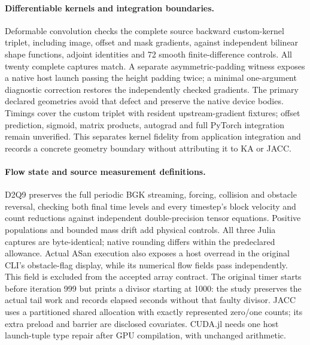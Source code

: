 \paragraph{Differentiable kernels and integration boundaries.}
Deformable convolution checks the complete source backward custom-kernel triplet, including image, offset and mask gradients, against independent bilinear shape functions, adjoint identities and 72 smooth finite-difference controls. All twenty complete captures match. A separate asymmetric-padding witness exposes a native host launch passing the height padding twice; a minimal one-argument diagnostic correction restores the independently checked gradients. The primary declared geometries avoid that defect and preserve the native device bodies. Timings cover the custom triplet with resident upstream-gradient fixtures; offset prediction, sigmoid, matrix products, autograd and full PyTorch integration remain unverified. This separates kernel fidelity from application integration and records a concrete geometry boundary without attributing it to KA or JACC.

\paragraph{Flow state and source measurement definitions.}
D2Q9 preserves the full periodic BGK streaming, forcing, collision and obstacle reversal, checking both final time levels and every timestep's block velocity and count reductions against independent double-precision tensor equations. Positive populations and bounded mass drift add physical controls. All three Julia captures are byte-identical; native rounding differs within the predeclared allowance. Actual ASan execution also exposes a host overread in the original CLI's obstacle-flag display, while its numerical flow fields pass independently. This field is excluded from the accepted array contract. The original timer starts before iteration 999 but prints a divisor starting at 1000: the study preserves the actual tail work and records elapsed seconds without that faulty divisor. JACC uses a partitioned shared allocation with exactly represented zero/one counts; its extra preload and barrier are disclosed covariates. CUDA.jl needs one host launch-tuple type repair after GPU compilation, with unchanged arithmetic.

